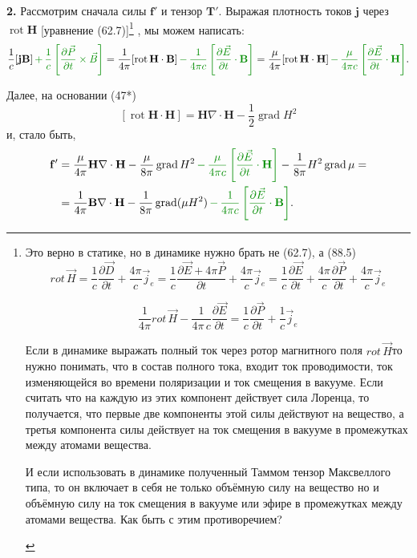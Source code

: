 \documentclass[a4paper,10pt]{article}
\newcommand{\modmath}[1]{\textcolor{modcolor}{#1}}
\newcommand{\modblock}[1]{\colorbox{modcolor!10}{\parbox{\dimexpr\linewidth-2\fboxsep}{#1}}}
\begin{document}
\textbf{2.} Рассмотрим сначала силы $\mathbf{f}'$ и тензор $\mathbf{T}'$.
Выражая плотность токов $\mathbf{j}$ через $\operatorname{rot}\mathbf{H}$
[уравнение (62.7)]\footnote{
\modblock{
Это верно в статике, но в динамике нужно брать не (62.7), а (88.5)
\begin{equation}
rot\,\vec{H} = \frac{1}{c}\frac{\partial \vec D}{\partial t} + \frac{4\pi}{c}\vec j_e
 = \frac{1}{c}\frac{\partial \vec E + 4 \pi \vec P}{\partial t} + \frac{4\pi}{c}\vec j_e
 = \frac{1}{c}\frac{\partial \vec E}{\partial t} + \frac{4\pi}{c} \frac{\partial\vec P}{\partial t} + \frac{4\pi}{c}\vec j_e
\end{equation}

\begin{equation}
\frac{1}{4\pi}rot\,\vec{H} - \frac{1}{4\pi\,c}\frac{\partial \vec E}{\partial t} = \frac{1}{c} \frac{\partial\vec P}{\partial t} + \frac{1}{c}\vec j_e
\end{equation}

Если в динамике выражать полный ток через ротор магнитного поля $rot\,\vec{H}$то нужно понимать, что в состав полного тока, входит ток проводимости, ток изменяющейся во времени поляризации и ток смещения в вакууме. Если считать что на каждую из этих компонент действует сила Лоренца, то получается, что первые две компоненты этой силы действуют на вещество, а третья компонента силы действует на ток смещения в вакууме в промежутках между атомами вещества.

И если использовать в динамике полученный Таммом тензор Максвеллого типа, то он включает в себя не только объёмную силу на вещество но и объёмную силу на ток смещения в вакууме или эфире в промежутках между атомами вещества. Как быть с этим противоречием?
}%
}%
, мы можем написать:
$$
    \frac{1}{c}[\mathbf{j}\mathbf{B}] \modmath{\,+\,\frac{1}{c}\left[\frac{\partial\vec{P}}{\partial t} \times \vec{B}\right]}
    = \frac{1}{4\pi}[\operatorname{rot}\mathbf{H}\cdot\mathbf{B}] \modmath{\,-\, \frac{1}{4\pi c}\left[\frac{\partial \vec E}{\partial t}\cdot\mathbf{B}\right]}
    = \frac{\mu}{4\pi}[\operatorname{rot}\mathbf{H}\cdot\mathbf{H}]\modmath{\,-\, \frac{\mu}{4\pi c}\left[\frac{\partial \vec E}{\partial t}\cdot\mathbf{H}\right]}.
$$

Далее, на основании (47*)
$$
    [\operatorname{rot}\mathbf{H}\cdot\mathbf{H}]
    = \mathbf{H}\nabla\cdot\mathbf{H} - \frac{1}{2}\operatorname{grad}H^2
$$
и, стало быть,
\begin{align*}
    \mathbf{f}' &= \frac{\mu}{4\pi}\mathbf{H}\nabla\cdot\mathbf{H}
                 - \frac{\mu}{8\pi}\operatorname{grad}H^2
                 \modmath{\,- \,\frac{\mu}{4\pi c}\left[\frac{\partial \vec E}{\partial t}\cdot\mathbf{H}\right]}
                 - \frac{1}{8\pi}H^2\operatorname{grad}\mu = \\
                &= \frac{1}{4\pi}\mathbf{B}\nabla\cdot\mathbf{H}
                 - \frac{1}{8\pi}\operatorname{grad}(\mu H^2)\modmath{\,- \,\frac{1}{4\pi c}\left[\frac{\partial \vec E}{\partial t}\cdot\mathbf{B}\right]}.
\end{align*}
\end{document}
